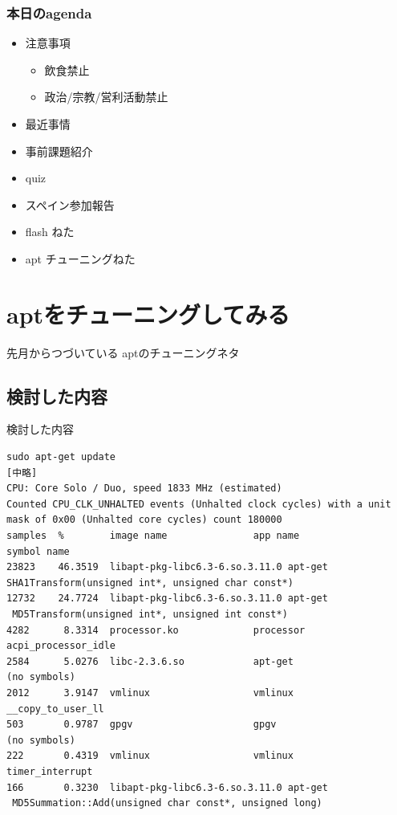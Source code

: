 \documentclass[cjk,dvipdfmx]{beamer}
\begin{document}
\begin{frame}
 \frametitle{本日のagenda}
\begin{minipage}[t]{0.4\hsize}
  \begin{itemize}
  \item 注意事項
	\begin{itemize}
	 \item 飲食禁止
	 \item 政治/宗教/営利活動禁止
	\end{itemize}
  \item 最近事情
  \item 事前課題紹介
  \item quiz
 \end{itemize}
\end{minipage} 
\begin{minipage}[t]{0.4\hsize}
\begin{itemize}
  \item スペイン参加報告
  \item flash ねた
  \item apt チューニングねた
 \end{itemize}
\end{minipage}
\end{frame}

\section{aptをチューニングしてみる}

\begin{frame}
先月からつづいている aptのチューニングネタ
\end{frame}

\subsection{検討した内容}
\begin{frame}[containsverbatim]{検討した内容}
\begin{verbatim}
sudo apt-get update
[中略]
CPU: Core Solo / Duo, speed 1833 MHz (estimated)
Counted CPU_CLK_UNHALTED events (Unhalted clock cycles) with a unit mask of 0x00 (Unhalted core cycles) count 180000
samples  %        image name               app name                 symbol name
23823    46.3519  libapt-pkg-libc6.3-6.so.3.11.0 apt-get                  
SHA1Transform(unsigned int*, unsigned char const*)
12732    24.7724  libapt-pkg-libc6.3-6.so.3.11.0 apt-get
 MD5Transform(unsigned int*, unsigned int const*) 
4282      8.3314  processor.ko             processor                acpi_processor_idle
2584      5.0276  libc-2.3.6.so            apt-get                  (no symbols)
2012      3.9147  vmlinux                  vmlinux                  __copy_to_user_ll
503       0.9787  gpgv                     gpgv                     (no symbols)
222       0.4319  vmlinux                  vmlinux                  timer_interrupt
166       0.3230  libapt-pkg-libc6.3-6.so.3.11.0 apt-get
 MD5Summation::Add(unsigned char const*, unsigned long) 
\end{verbatim}
\end{frame}
\end{document}
